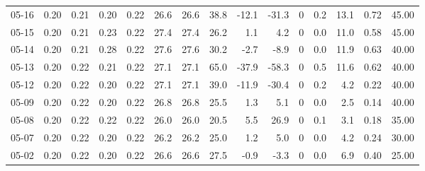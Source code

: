\begin{threeparttable}
{\begin{tabular}{lrrrrrrrrrrrrrr}
  05-16 &          0.20 &          0.21 &          0.20 &        0.22 &                26.6 &               26.6 &                38.8 &      -12.1 &        -31.3 &              0 &                 0.2 &             13.1 &            0.72 &                  45.00 \\
  05-15 &          0.20 &          0.21 &          0.23 &        0.22 &                27.4 &               27.4 &                26.2 &        1.1 &          4.2 &              0 &                 0.0 &             11.0 &            0.58 &                  45.00 \\
  05-14 &          0.20 &          0.21 &          0.28 &        0.22 &                27.6 &               27.6 &                30.2 &       -2.7 &         -8.9 &              0 &                 0.0 &             11.9 &            0.63 &                  40.00 \\
  05-13 &          0.20 &          0.22 &          0.21 &        0.22 &                27.1 &               27.1 &                65.0 &      -37.9 &        -58.3 &              0 &                 0.5 &             11.6 &            0.62 &                  40.00 \\
  05-12 &          0.20 &          0.22 &          0.20 &        0.22 &                27.1 &               27.1 &                39.0 &      -11.9 &        -30.4 &              0 &                 0.2 &              4.2 &            0.22 &                  40.00 \\
  05-09 &          0.20 &          0.22 &          0.20 &        0.22 &                26.8 &               26.8 &                25.5 &        1.3 &          5.1 &              0 &                 0.0 &              2.5 &            0.14 &                  40.00 \\
  05-08 &          0.20 &          0.22 &          0.22 &        0.22 &                26.0 &               26.0 &                20.5 &        5.5 &         26.9 &              0 &                 0.1 &              3.1 &            0.18 &                  35.00 \\
  05-07 &          0.20 &          0.22 &          0.20 &        0.22 &                26.2 &               26.2 &                25.0 &        1.2 &          5.0 &              0 &                 0.0 &              4.2 &            0.24 &                  30.00 \\
  05-02 &          0.20 &          0.22 &          0.20 &        0.22 &                26.6 &               26.6 &                27.5 &       -0.9 &         -3.3 &              0 &                 0.0 &              6.9 &            0.40 &                  25.00 \\

\end{tabular}}
\end{threeparttable}
